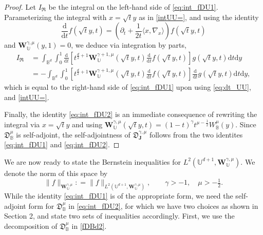 \documentclass{amsart}
\theoremstyle{remark}
\def\la{{\langle}}
\def\ra{{\rangle}}
\def\d{\mathrm{d}}
\def\fD{{\mathfrak D}}
\def\fR{{\mathfrak R}}
\def\g{{\gamma}}
\def\la{{\langle}}
\def\ra{{\rangle}}
\def\Jb{{\mathbf J}}
\def\Wb{{\mathbf W}}
\def\BB{{\mathbb B}}
\def\UU{{\mathbb U}}
\def\f{\frac}
\begin{document}
\begin{proof}
Let $I_\fR$ be the integral on the left-hand side of \eqref{eq:int_fDU1}. Parameterizing the integral with $x = \sqrt{t} y$
as in \eqref{intUU=}, and using the identity
\begin{equation}\label{eq:dt_UU}
   \frac{\d}{\d t} f\left(\sqrt{t} y, t\right ) = \left(\partial_t + \frac{1}{2t} \la x, \nabla_x \ra \right) f\left(\sqrt{t} y, t\right )
\end{equation}
and $\Wb_\UU^{\g,\mu}(y, 1) = 0$, we deduce via integration by parts, 
\begin{align*}
  I_{\fR}\,& = \int_{\BB^d} \int_0^1 \frac{\d} {\d t} \left[ t^{\frac{d}{2}+1} \Wb_\UU^{\g+1,\mu}\left(\sqrt{t} y, t\right) 
     \frac{\d} {\d t}f\left(\sqrt{t} y, t\right ) \right] g \left(\sqrt{t} y, t\right ) \d t \d y \\
     & = - \int_{\BB^d} \int_0^1\left[ t^{\frac{d}{2}+1} \Wb_\UU^{\g+1,\mu}\left(\sqrt{t} y, t\right) 
   \frac{\d} {\d t}  f\left(\sqrt{t} y, t\right ) \right]   \frac{\d} {\d t} g \left(\sqrt{t} y, t\right ) \d t \d y,
\end{align*} 
which is equal to the right-hand side of \eqref{eq:int_fDU1} upon using \eqref{eq:dt_UU}, and \eqref{intUU=}. 

Finally, the identity \eqref{eq:int_fDU2} is an immediate consequence of rewriting the integral via $x = \sqrt{t} y$
and using $\Wb_\UU^{\g,\mu} (\sqrt{t} y, t) = (1-t)^\g t^{\mu-\f12} W_\BB^\mu (y)$. Since $\fD_\BB^\mu$ is self-adjoint,
the self-adjointness of $\fD_\Jb^{\g,\mu}$ follows from the two identites \eqref{eq:int_fDU1} and \eqref{eq:int_fDU2}. 
\end{proof}

We are now ready to state the Bernstein inequalities for $L^2(\UU^{d+1}, \Wb_\UU^{\g,\mu})$. We denote 
the norm of this space by 
$$
  \| f \|_{\Wb_{\UU}^{\g,\mu}} : = \|f\|_{L^2(\UU^{d+1}, \Wb_\UU^{\g,\mu})}, \qquad \g >  -1, \quad \mu > - \tfrac 12.
$$
While the identity \eqref{eq:int_fDU1} is of the appropriate form, we need the self-adjoint form for $\fD_\BB^\mu$
in \eqref{eq:int_fDU2}, for which we have two choices as shown in Section 2, and state two sets of inequalities
accordingly. First, we use the decomposition of $\fD_\BB^\mu$ in \eqref{fDBd2}. 
\end{document}
